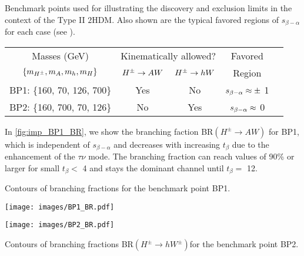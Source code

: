 \begin{table}
  \begin{sidecaption}{Benchmark points used for illustrating the discovery and exclusion limits in the context of the Type II $2$HDM. Also shown are the typical favored regions of $s_{\beta-\alpha}$ for each case (see \cite{Coleppa:2013dya}). } 
\begin{center}
 \begin{tabular}{ccccl}
 \toprule
 Masses (GeV) & \multicolumn{2}{c}{Kinematically allowed?} & Favored\\ \cmidrule{2-3}
 $\left\{ {m_{H^{\pm}},m_{A},m_{h},m_{H}}\right\}$ & $H^{\pm}\rightarrow A W$ & $H^{\pm}\rightarrow h W$ & Region\\\midrule
  BP1: \{160, 70, 126, 700\} & Yes & No & $s_{\beta-\alpha}\approx\pm$ 1 \\ \midrule
 BP2: \{160, 700, 70, 126\} & No & Yes & $s_{\beta-\alpha}\approx$ 0 \\
 \bottomrule
 \end{tabular}
\end{center}
\end{sidecaption}
\label{tab:classification}
\end{table}


In \autoref{fig:imp_BP1_BR}, we show the branching faction BR$(H^{\pm} \rightarrow AW)$ for BP1, which is independent of $s_{\beta-\alpha}$ and decreases with increasing $t_{\beta}$ due to the enhancement of the $\tau\nu$ mode. The branching fraction can reach values of 90\% or larger for small $t_{\beta}<$ 4 and stays the dominant channel until $t_{\beta}=$ 12. 

\begin{marginfigure}[-3in]
 \caption{Contours of branching fractions for the benchmark point BP1.}
 \texttt{[image: images/BP1\_BR.pdf]}
\label{fig:imp_BP1_BR}
\end{marginfigure}

\begin{marginfigure}
 \centering
\texttt{[image: images/BP2\_BR.pdf]}
\caption{Contours of branching fractions BR$(H^\pm\rightarrow hW^\pm)$for the benchmark point BP2.}
\label{fig:imp_BP2_BR}
\end{marginfigure}

